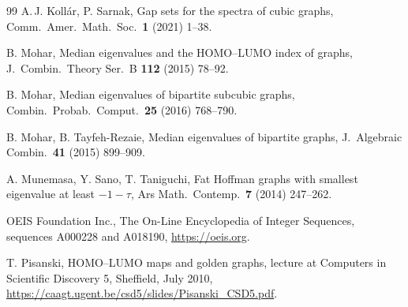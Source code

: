\documentclass[11pt]{article}
\theoremstyle{definition}
\begin{document}
\begin{thebibliography}{99}
A.\,J. Koll\'ar, P. Sarnak,
Gap sets for the spectra of cubic graphs,
Comm.\ Amer.\ Math.\ Soc.\ \textbf{1} (2021) 1--38.

B. Mohar,
Median eigenvalues and the HOMO--LUMO index of graphs,
J.\ Combin.\ Theory Ser.\ B \textbf{112} (2015) 78--92.

B. Mohar,
Median eigenvalues of bipartite subcubic graphs,
Combin.\ Probab.\ Comput.\ \textbf{25} (2016) 768--790.

B. Mohar, B. Tayfeh-Rezaie,
Median eigenvalues of bipartite graphs,
J.\ Algebraic Combin.\ \textbf{41} (2015) 899--909.

A. Munemasa, Y. Sano, T. Taniguchi,
Fat Hoffman graphs with smallest eigenvalue at least $-1-\tau$,
Ars Math.\ Contemp.\ \textbf{7} (2014) 247--262.

OEIS Foundation Inc.,
The On-Line Encyclopedia of Integer Sequences,
sequences A000228 and A018190, \url{https://oeis.org}.

T. Pisanski,
HOMO--LUMO maps and golden graphs,
lecture at Computers in Scientific Discovery 5, Sheffield, July 2010,
\url{https://caagt.ugent.be/csd5/slides/Pisanski_CSD5.pdf}.

\end{thebibliography}
\end{document}
